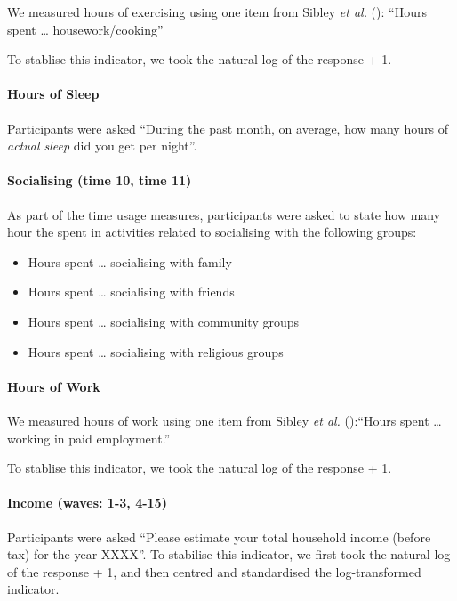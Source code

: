 \documentclass[
  singlecolumn]{article}
\let\oldparagraph\paragraph
\renewcommand{\paragraph}[1]{\oldparagraph{#1}\mbox{}}
\providecommand{\tightlist}{%
  \setlength{\itemsep}{0pt}\setlength{\parskip}{0pt}}\usepackage{longtable,booktabs,array}
\begin{document}
We measured hours of exercising using one item from Sibley \emph{et al.}
(): ``Hours spent \ldots{}
housework/cooking''

To stablise this indicator, we took the natural log of the response + 1.

\paragraph{Hours of Sleep}\label{hours-of-sleep}

Participants were asked ``During the past month, on average, how many
hours of \emph{actual sleep} did you get per night''.

\paragraph{Socialising (time 10, time
11)}\label{socialising-time-10-time-11}

As part of the time usage measures, participants were asked to state how
many hour the spent in activities related to socialising with the
following groups:

\begin{itemize}
\tightlist
\item
  Hours spent \ldots{} socialising with family
\item
  Hours spent \ldots{} socialising with friends
\item
  Hours spent \ldots{} socialising with community groups
\item
  Hours spent \ldots{} socialising with religious groups
\end{itemize}

\paragraph{Hours of Work}\label{hours-of-work}

We measured hours of work using one item from Sibley \emph{et al.}
():``Hours spent \ldots{} working in paid
employment.''

To stablise this indicator, we took the natural log of the response + 1.

\paragraph{Income (waves: 1-3, 4-15)}\label{income-waves-1-3-4-15}

Participants were asked ``Please estimate your total household income
(before tax) for the year XXXX''. To stabilise this indicator, we first
took the natural log of the response + 1, and then centred and
standardised the log-transformed indicator.
\end{document}
